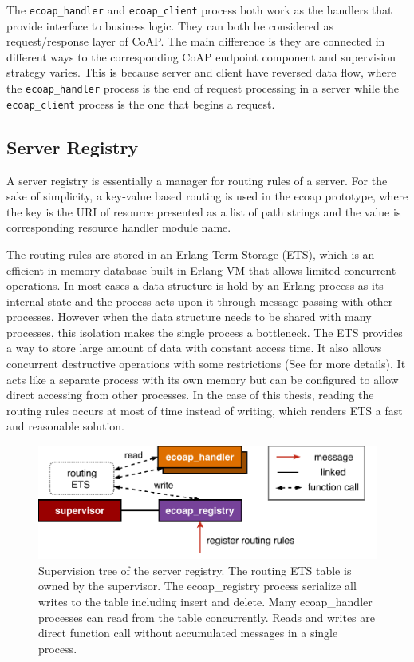 The \verb|ecoap_handler| and \verb|ecoap_client| process both work as the handlers that provide interface to business logic. They can both be considered as request/response layer of CoAP. The main difference is they are connected in different ways to the corresponding CoAP endpoint component and supervision strategy varies. This is because server and client have reversed data flow, where the \verb|ecoap_handler| process is the end of request processing in a server while the \verb|ecoap_client| process is the one that begins a request.

\subsection{Server Registry}\label{coap_registry}

A server registry is essentially a manager for routing rules of a server. For the sake of simplicity, a key-value based routing is used in the ecoap prototype, where the key is the URI of resource presented as a list of path strings and the value is corresponding resource handler module name. 

The routing rules are stored in an Erlang Term Storage (ETS), which is an efficient in-memory database built in Erlang VM that allows limited concurrent operations. In most cases a data structure is hold by an Erlang process as its internal state and the process acts upon it through message passing with other processes. However when the data structure needs to be shared with many processes, this isolation makes the single process a bottleneck. The ETS provides a way to store large amount of data with constant access time. It also allows concurrent destructive operations with some restrictions (See \autocite{ets} for more details). It acts like a separate process with its own memory but can be configured to allow direct accessing from other processes. In the case of this thesis, reading the routing rules occurs at most of time instead of writing, which renders ETS a fast and reasonable solution. 

\begin{figure}[!htbp]
\centering
\includegraphics[scale = 0.7]{coap_registry}
\caption[Supervision tree of the server registry]{Supervision tree of the server registry. The routing ETS table is owned by the supervisor. The ecoap\_registry process serialize all writes to the table including insert and delete. Many ecoap\_handler processes can read from the table concurrently. Reads and writes are direct function call without accumulated messages in a single process.}
\label{fig:coap_registry}
\end{figure}
 
